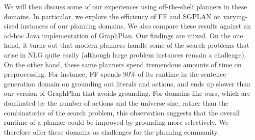 We will then discuss some of our experiences using off-the-shelf planners
in these domains. In particular, we explore the efficiency of FF
\cite{HoffmannNebel01} and SGPLAN \cite{hsu06:_new_featur_in_sgplan_for} on
varying-sized instances of our planning domains. We also compare these
results against an ad-hoc Java implementation of GraphPlan.  Our findings
are mixed. On the one hand, it turns out that modern planners handle some
of the search problems that arise in NLG quite easily (although large
problem instances remain a challenge). On the other hand, these same
planners spend tremendous amounts of time on preprocessing. For instance,
FF spends 90\% of its runtime in the sentence generation domain on
grounding out literals and actions, and ends up slower than our version of
GraphPlan that avoids grounding. For domains like ours, which are dominated
by the number of actions and the universe size, rather than the
combinatorics of the search problem, this observation suggests that the
overall runtime of a planner could be improved by grounding more
selectively. We therefore offer these domains as challenges for the
planning community.




